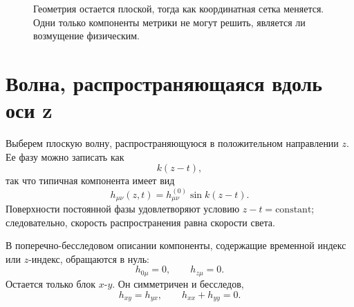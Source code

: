 \begin{figure}[htbp]
\centering
{}
\caption{Геометрия остается плоской, тогда как координатная сетка меняется. Одни только компоненты метрики не могут решить, является ли возмущение физическим.}
\end{figure}

\section{Волна, распространяющаяся вдоль оси z}

Выберем плоскую волну, распространяющуюся в положительном направлении \(z\). Ее фазу можно записать как
\begin{equation}
 k(z-t),
\end{equation}
так что типичная компонента имеет вид
\begin{equation}
 h_{\mu\nu}(z,t)
 =h_{\mu\nu}^{(0)}\sin k(z-t).
 \label{eq:plane-wave}
\end{equation}
Поверхности постоянной фазы удовлетворяют условию \(z-t=\text{constant}\); следовательно, скорость распространения равна скорости света.

В поперечно-бесследовом описании компоненты, содержащие временной индекс или \(z\)-индекс, обращаются в нуль:
\begin{equation}
 h_{0\mu}=0,
 \qquad
 h_{z\mu}=0.
 \label{eq:tt-transverse}
\end{equation}
Остается только блок \(x\)-\(y\). Он симметричен и бесследов,
\begin{equation}
 h_{xy}=h_{yx},
 \qquad
 h_{xx}+h_{yy}=0.
 \label{eq:tt-trace}
\end{equation}

